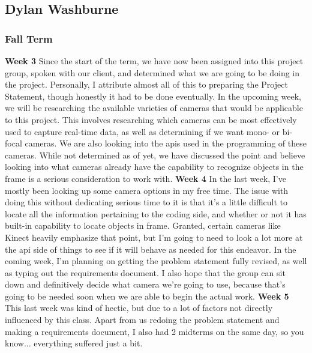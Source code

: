\documentclass[onecolumn, draftclsnofoot,10pt, compsoc]{IEEEtran}
\begin{document}
\subsection{Dylan Washburne}
\subsubsection{Fall Term}

\textbf{Week 3}
\newline
Since the start of the term, we have now been assigned into this project group, spoken with our client, and determined what we are going to be doing in the project. Personally, I attribute almost all of this to preparing the Project Statement, though honestly it had to be done eventually.
\newline
In the upcoming week, we will be researching the available varieties of cameras that would be applicable to this project. This involves researching which cameras can be most effectively used to capture real-time data, as well as determining if we want mono- or bi-focal cameras.
\newline
We are also looking into the apis used in the programming of these cameras. While not determined as of yet, we have discussed the point and believe looking into what cameras already have the capability to recognize objects in the frame is a serious consideration to work with.
\newline
\textbf{Week 4}
\newline
In the last week, I've mostly been looking up some camera options in my free time. The issue with doing this without dedicating serious time to it is that it's a little difficult to locate all the information pertaining to the coding side, and whether or not it has built-in capability to locate objects in frame. Granted, certain cameras like Kinect heavily emphasize that point, but I'm going to need to look a lot more at the api side of things to see if it will behave as needed for this endeavor.
\newline
In the coming week, I'm planning on getting the problem statement fully revised, as well as typing out the requirements document. I also hope that the group can sit down and definitively decide what camera we're going to use, because that's going to be needed soon when we are able to begin the actual work.
\newline
\textbf{Week 5}
\newline
This last week was kind of hectic, but due to a lot of factors not directly influenced by this class. Apart from us redoing the problem statement and making a requirements document, I also had 2 midterms on the same day, so you know... everything suffered just a bit.
\end{document}
